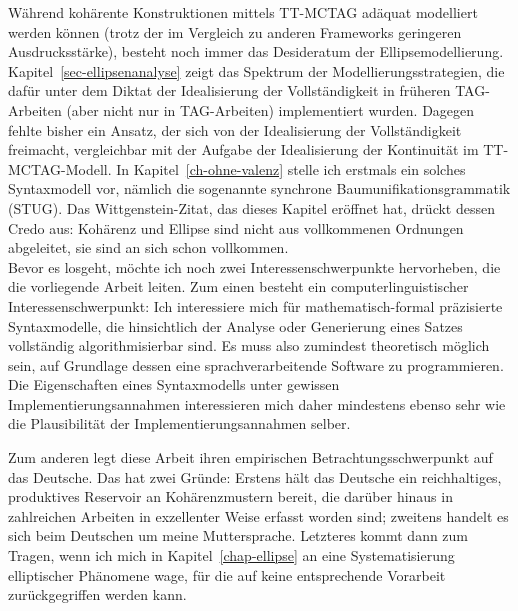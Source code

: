 Während kohärente Konstruktionen mittels TT-MCTAG adäquat modelliert werden können (trotz der im Vergleich zu anderen Frameworks geringeren Ausdrucksstärke), besteht noch immer das Desideratum der Ellipsemodellierung. Kapitel~\ref{sec-ellipsenanalyse} zeigt das Spektrum der Modellierungsstrategien, die dafür unter dem Diktat der Idealisierung der Vollständigkeit in früheren TAG-Arbeiten (aber nicht nur in TAG-Arbeiten) implementiert wurden. Dagegen fehlte bisher ein Ansatz, der sich von der Idealisierung der Vollständigkeit freimacht, vergleichbar mit der Aufgabe der Idealisierung der Kontinuität im TT-MCTAG-Modell. In Kapitel~\ref{ch-ohne-valenz} stelle ich erstmals ein solches Syntaxmodell vor, nämlich die sogenannte synchrone Baumunifikationsgrammatik (STUG). Das Wittgenstein-Zitat, das dieses Kapitel eröffnet hat, drückt dessen Credo aus: Kohärenz und Ellipse sind nicht aus vollkommenen Ordnungen abgeleitet, sie sind an sich schon vollkommen. \\

Bevor es losgeht, möchte ich noch zwei Interessenschwerpunkte hervorheben, die die vorliegende Arbeit leiten. Zum einen besteht ein computerlinguistischer Interessenschwerpunkt: Ich interessiere mich für mathematisch-formal präzisierte Syntaxmodelle, die hinsichtlich der Analyse oder Generierung eines Satzes vollständig algorithmisierbar sind. Es muss also zumindest theoretisch möglich sein, auf Grundlage dessen eine sprachverarbeitende Software zu programmieren. Die Eigenschaften eines Syntaxmodells unter gewissen Implementierungsannahmen interessieren mich daher mindestens ebenso sehr wie die Plausibilität der Implementierungsannahmen selber.    

Zum anderen legt diese Arbeit ihren empirischen Betrachtungsschwerpunkt auf das Deutsche. Das hat zwei Gründe: Erstens hält das Deutsche ein reichhaltiges, produktives Reservoir an Kohärenzmustern bereit, die darüber hinaus in zahlreichen Arbeiten in exzellenter Weise erfasst worden sind; zweitens handelt es sich beim Deutschen um meine Muttersprache. Letzteres kommt dann zum Tragen, wenn ich mich in Kapitel~\ref{chap-ellipse} an eine Systematisierung elliptischer Phänomene wage, für die auf keine entsprechende Vorarbeit zurückgegriffen werden kann.








